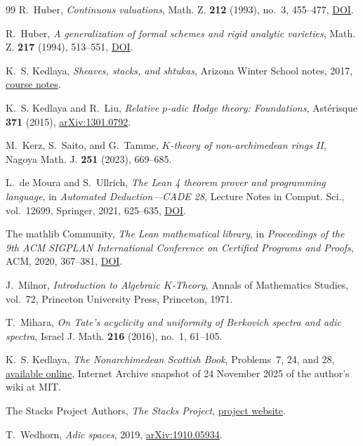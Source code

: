 \documentclass[11pt,reqno]{amsart}
\theoremstyle{definition}
\begin{document}
\begin{thebibliography}{99}
R.~Huber,
\emph{Continuous valuations},
Math. Z. \textbf{212} (1993), no.~3, 455--477,
\href{https://doi.org/10.1007/BF02571668}{DOI}.

R.~Huber,
\emph{A generalization of formal schemes and rigid analytic varieties},
Math. Z. \textbf{217} (1994), 513--551,
\href{https://doi.org/10.1007/BF02571959}{DOI}.


K.~S. Kedlaya,
\emph{Sheaves, stacks, and shtukas},
Arizona Winter School notes, 2017,
\href{https://swc-math.github.io/aws/2017/2017KedlayaNotes.pdf}{course notes}.

K.~S. Kedlaya and R.~Liu,
\emph{Relative $p$-adic Hodge theory: Foundations},
Ast\'erisque \textbf{371} (2015),
\href{https://arxiv.org/abs/1301.0792}{arXiv:1301.0792}.

M.~Kerz, S.~Saito, and G.~Tamme,
\emph{$K$-theory of non-archimedean rings II},
Nagoya Math. J. \textbf{251} (2023), 669--685.

L.~de Moura and S.~Ullrich,
\emph{The Lean 4 theorem prover and programming language},
in \emph{Automated Deduction---CADE 28},
Lecture Notes in Comput. Sci., vol.~12699, Springer, 2021, 625--635,
\href{https://doi.org/10.1007/978-3-030-79876-5_37}{DOI}.

The mathlib Community,
\emph{The Lean mathematical library},
in \emph{Proceedings of the 9th ACM SIGPLAN International Conference on
Certified Programs and Proofs}, ACM, 2020, 367--381,
\href{https://doi.org/10.1145/3372885.3373824}{DOI}.

J.~Milnor,
\emph{Introduction to Algebraic $K$-Theory},
Annals of Mathematics Studies, vol.~72,
Princeton University Press, Princeton, 1971.

T.~Mihara,
\emph{On Tate's acyclicity and uniformity of Berkovich spectra and adic spectra},
Israel J. Math. \textbf{216} (2016), no.~1, 61--105.

K.~S. Kedlaya,
\emph{The Nonarchimedean Scottish Book}, Problems~7, 24, and 28,
\href{https://web.archive.org/web/20251124070248/https://scripts.mit.edu/~kedlaya/wiki/index.php?title=The_Nonarchimedean_Scottish_Book}{available
online}, Internet Archive snapshot of 24 November 2025 of the author's wiki at
MIT.

The Stacks Project Authors,
\emph{The Stacks Project},
\href{https://stacks.math.columbia.edu}{project website}.

T.~Wedhorn,
\emph{Adic spaces},
2019,
\href{https://arxiv.org/abs/1910.05934}{arXiv:1910.05934}.

\end{thebibliography}
\end{document}

